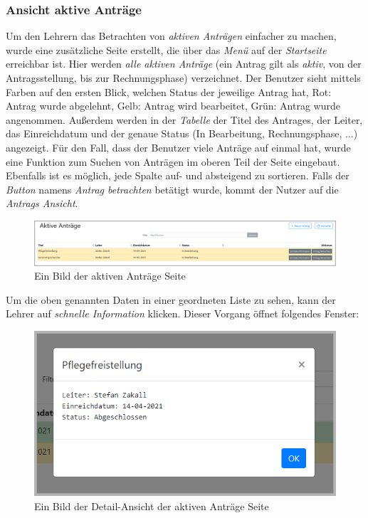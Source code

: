 \subsubsection{Ansicht aktive Anträge}
\label{chapter:implementierung-frontend-komponenten-aktiv}
Um den Lehrern das Betrachten von \textit{aktiven Anträgen} einfacher zu machen, wurde eine zusätzliche Seite erstellt, die über das \textit{Menü} auf der \textit{Startseite} erreichbar ist. Hier werden \textit{alle aktiven Anträge} (ein Antrag gilt als \textit{aktiv}, von der Antragsstellung, bis zur Rechnungsphase) verzeichnet. Der Benutzer sieht mittels Farben auf den ersten Blick, welchen Status der jeweilige Antrag hat, Rot: Antrag wurde abgelehnt, Gelb: Antrag wird bearbeitet, Grün: Antrag wurde angenommen. Außerdem werden in der \textit{Tabelle} der Titel des Antrages, der Leiter, das Einreichdatum und der genaue Status (In Bearbeitung, Rechnungsphase, ...) angezeigt. Für den Fall, dass der Benutzer viele Anträge auf einmal hat, wurde eine Funktion zum Suchen von Anträgen im oberen Teil der Seite eingebaut. Ebenfalls ist es möglich, jede Spalte auf- und absteigend zu sortieren. Falls der \textit{Button} namens \textit{Antrag betrachten} betätigt wurde, kommt der Nutzer auf die \textit{Antrags Ansicht}.
\begin{figure}[H]
	\centering
	\includegraphics[width=1\linewidth]{images/ldehner_implementierung/aktiv}
	\caption[Aktive Anträge Seite]{Ein Bild der aktiven Anträge Seite}
	\label{fig:antragaktiv}
\end{figure}
Um die oben genannten Daten in einer geordneten Liste zu sehen, kann der Lehrer auf \textit{schnelle Information} klicken. Dieser Vorgang öffnet folgendes Fenster:
\begin{figure}[H]
	\centering
	\includegraphics[width=0.6\linewidth]{images/ldehner_implementierung/aktiv_detail}
	\caption[Aktive Anträge \textit{Pop-Up Fenster}]{Ein Bild der Detail-Ansicht der aktiven Anträge Seite}
	\label{fig:antragaktivdetail}
\end{figure}
\newpage

